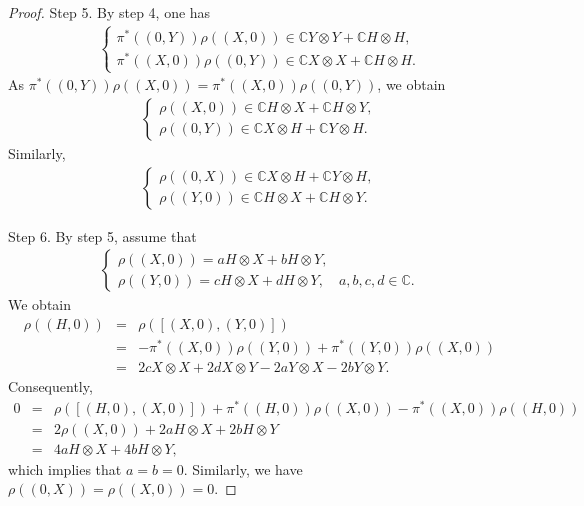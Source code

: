 \documentclass[10pt,a4paper]{amsart}
\begin{document}
\begin{proof}
Step 5. By step 4, one has
\begin{eqnarray*}
\begin{cases}
\pi^{\ast}((0,Y))\rho((X,0))\in \mathbb{C}Y\otimes Y+\mathbb{C}H\otimes H,\\
\pi^{\ast}((X,0))\rho((0,Y))\in \mathbb{C}X\otimes X+\mathbb{C}H\otimes H.
\end{cases}
\end{eqnarray*}
As $\pi^{\ast}((0,Y))\rho((X,0))=\pi^{\ast}((X,0))\rho((0,Y))$, we obtain
\begin{eqnarray*}
\begin{cases}
\rho((X,0))\in \mathbb{C} H\otimes X+\mathbb{C} H\otimes Y,\\
\rho((0,Y))\in \mathbb{C} X\otimes H+\mathbb{C} Y\otimes H.
\end{cases}
\end{eqnarray*}
Similarly,
\begin{eqnarray*}
\begin{cases}
\rho((0,X))\in \mathbb{C} X\otimes H+\mathbb{C} Y\otimes H,\\
\rho((Y,0))\in \mathbb{C} H\otimes X+\mathbb{C} H\otimes Y.
\end{cases}
\end{eqnarray*}

Step 6. By step 5, assume that
\begin{eqnarray*}
\begin{cases}
\rho((X,0))=a H\otimes X+b H\otimes Y,\\
\rho((Y,0))= c H\otimes X+d H\otimes Y, \quad  a,b,c,d\in \mathbb{C}.
\end{cases}
\end{eqnarray*}
We obtain
\begin{eqnarray*}
\rho((H,0))&=&\rho([(X,0),(Y,0)])\\
           &=&-\pi^{\ast}((X,0))\rho((Y,0))+\pi^{\ast}((Y,0))\rho((X,0))\\
           &=& 2cX\otimes X+2dX\otimes Y-2aY\otimes X-2bY\otimes Y.
\end{eqnarray*}
Consequently,
\begin{eqnarray*}
0 &=& \rho([(H,0),(X,0)])+\pi^{\ast}((H,0))\rho((X,0))-\pi^{\ast}((X,0))\rho((H,0))\\
  &=& 2\rho((X,0))+2aH\otimes X+2bH\otimes Y\\
  &=& 4aH\otimes X+4bH\otimes Y,
\end{eqnarray*}
which implies that $a=b=0$. Similarly, we have $\rho((0,X))=\rho((X,0))=0$.


\end{proof}
\end{document}
